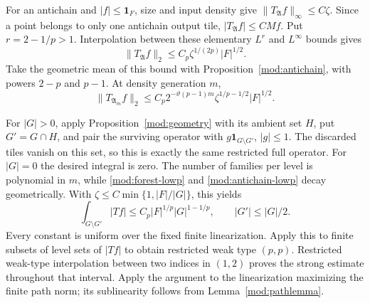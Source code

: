 \documentclass[11pt]{article}
\numberwithin{equation}{section}
\theoremstyle{remark}
\theoremstyle{definition}
\begin{document}
For an antichain and $|f|\le\mathbf1_F$, size and input density give
$\|T_\mathfrak A f\|_\infty\le C\zeta$. Since a point belongs to only one
antichain output tile, $|T_\mathfrak A f|\le CMf$. Put $r=2-1/p>1$.
Interpolation between these elementary $L^r$ and $L^\infty$ bounds gives
\[
 \|T_\mathfrak A f\|_2\le C_p\zeta^{1/(2p)}|F|^{1/2}.
\]
Take the geometric mean of this bound with
Proposition~\ref{mod:antichain}, with powers $2-p$ and $p-1$.
At density generation $m$,
\begin{equation}\label{mod:antichain-lowp}
 \|T_{\mathfrak A_m}f\|_2
 \le C_p2^{-\vartheta(p-1)m}
 \zeta^{1/p-1/2}|F|^{1/2}.
\end{equation}

For $|G|>0$, apply Proposition~\ref{mod:geometry} with its ambient
set $H$, put $G'=G\cap H$, and pair the surviving operator with
$g\mathbf1_{G\setminus G'}$, $|g|\le1$. The discarded tiles vanish
on this set, so this is exactly the same restricted full operator.
For $|G|=0$ the desired integral is zero. The number of families per level
is polynomial in $m$, while \eqref{mod:forest-lowp} and
\eqref{mod:antichain-lowp} decay geometrically. With
$\zeta\le C\min\{1,|F|/|G|\}$, this yields
\begin{equation}\label{mod:restricted-major-subset}
 \int_{G\setminus G'}|Tf|
 \le C_p|F|^{1/p}|G|^{1-1/p},\qquad |G'|\le|G|/2.
\end{equation}
Every constant is uniform over the fixed finite linearization.
Apply this to finite subsets of level sets of $|Tf|$ to obtain restricted
weak type $(p,p)$. Restricted weak-type interpolation between two indices
in $(1,2)$ proves the strong estimate throughout that interval. Apply the
argument to the linearization maximizing the finite path norm; its
sublinearity follows from Lemma~\ref{mod:pathlemma}.
\end{document}
